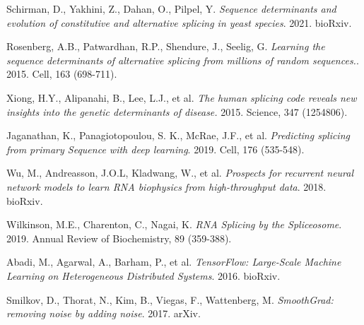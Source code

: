 \documentclass{article}
\begin{document}
\begin{thebibliography}{9}
Schirman, D., Yakhini, Z., Dahan, O., Pilpel, Y.
\textit{Sequence determinants and evolution of constitutive and alternative splicing in yeast species}. 2021. bioRxiv. 

Rosenberg, A.B., Patwardhan, R.P., Shendure, J., Seelig, G.
\textit{Learning the sequence determinants of alternative splicing from millions of random sequences.}. 2015. Cell, 163 (698-711). 

Xiong, H.Y., Alipanahi, B., Lee, L.J., et al. 
\textit{The human splicing code reveals new insights into the genetic determinants of disease.} 2015. Science, 347 (1254806).

Jaganathan, K., Panagiotopoulou, S. K., McRae, J.F., et al. 
\textit{Predicting splicing from primary Sequence with deep learning}. 2019. Cell, 176 (535-548). 

Wu, M., Andreasson, J.O.L, Kladwang, W., et al. \textit{Prospects for recurrent neural network models to learn RNA
biophysics from high-throughput data}. 2018. bioRxiv.

Wilkinson, M.E., Charenton, C., Nagai, K. \textit{RNA Splicing by the Spliceosome}. 2019. Annual Review of Biochemistry, 89 (359-388).

Abadi, M., Agarwal, A., Barham, P., et al. \textit{TensorFlow: Large-Scale Machine Learning on Heterogeneous Distributed Systems}. 2016. bioRxiv.

Smilkov, D., Thorat, N., Kim, B., Viegas, F., Wattenberg, M. \textit{SmoothGrad: removing noise by adding noise}. 2017. arXiv.
\end{thebibliography}
\end{document}
